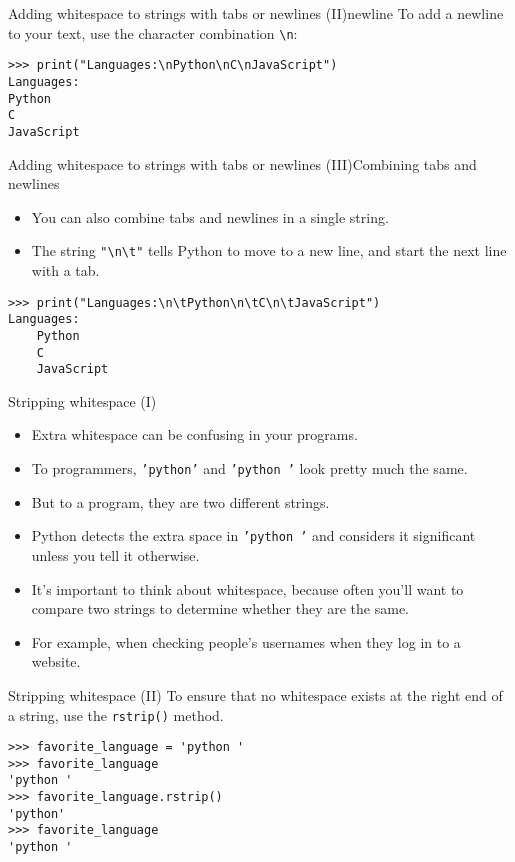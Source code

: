 \documentclass[aspectratio=169]{beamer}
\begin{document}
\begin{frame}[fragile]{Adding whitespace to strings with tabs or newlines (II)}{newline}
    To add a newline to your text, use the character combination \verb|\n|:
    \vspace{15pt}
    \begin{Verbatim}
>>> print("Languages:\nPython\nC\nJavaScript")
Languages:
Python
C
JavaScript
    \end{Verbatim}
\end{frame}


\begin{frame}[fragile]{Adding whitespace to strings with tabs or newlines (III)}{Combining tabs and newlines}
    \begin{itemize}[label=--]
        \item You can also combine tabs and newlines in a single string.
        \item The string \verb|"\n\t"| tells Python to move to a new line, and start the next line with a tab.
    \end{itemize}
    \vspace{15pt}
    \begin{Verbatim}
>>> print("Languages:\n\tPython\n\tC\n\tJavaScript")
Languages:
    Python
    C
    JavaScript
    \end{Verbatim}
\end{frame}


\begin{frame}{Stripping whitespace (I)}
    \begin{itemize}[label=--]
        \item Extra whitespace can be confusing in your programs.
        \item To programmers, \texttt{'python'} and \texttt{'python '} look pretty much the same.
        \item But to a program, they are two different strings.
        \item Python detects the extra space in \texttt{'python '} and considers it significant unless you tell it otherwise.
        \item It's important to think about whitespace, because often you'll want to compare two strings to determine whether they are the same.
        \item For example, when checking people's usernames when they log in to a website.
    \end{itemize}
\end{frame}


\begin{frame}[fragile]{Stripping whitespace (II)}
    To ensure that no whitespace exists at the right end of a string, use the \texttt{rstrip()} method.
    \vspace{10pt}
    \begin{Verbatim}
>>> favorite_language = 'python '
>>> favorite_language
'python '
>>> favorite_language.rstrip()
'python'
>>> favorite_language
'python '
    \end{Verbatim}
\end{frame}
\end{document}
